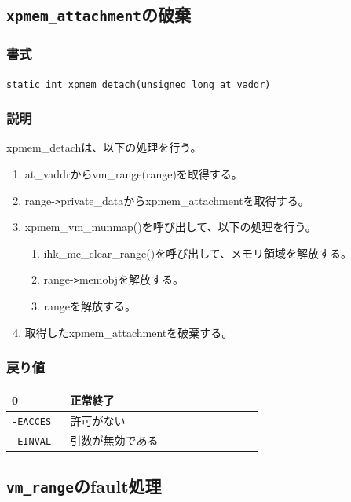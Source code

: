 \documentclass[twoside,11pt,fleqn]{book}
\begin{document}
\subsection{\texttt{xpmem\_attachment}の破棄}
\subsubsection*{書式}{\quad}
\texttt{static int xpmem\_detach(unsigned long at\_vaddr)
}

\subsubsection*{説明}{\quad}
xpmem\_detachは、以下の処理を行う。
\begin{enumerate}
  \item at\_vaddrからvm\_range(range)を取得する。
  \item range-\verb|>|private\_dataからxpmem\_attachmentを取得する。
  \item xpmem\_vm\_munmap()を呼び出して、以下の処理を行う。
  \begin{enumerate}
    \item ihk\_mc\_clear\_range()を呼び出して、メモリ領域を解放する。
    \item range-\verb|>|memobjを解放する。
    \item rangeを解放する。
  \end{enumerate}
  \item 取得したxpmem\_attachmentを破棄する。
\end{enumerate}

\subsubsection*{戻り値}{\quad}
\begin{table}[!h]
\footnotesize
\begin{tabular}{|p{0.20\linewidth}|p{0.66\linewidth}|} \hline
0&正常終了\\ \hline
\texttt{-EACCES}&許可がない\\ \hline
\texttt{-EINVAL}&引数が無効である\\ \hline
\end{tabular}
\vspace{-0em}
\end{table}
\FloatBarrier

\subsection{\texttt{vm\_range}のfault処理}
\end{document}
